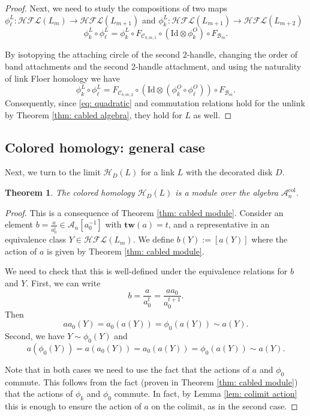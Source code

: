 \documentclass{amsart}
\newtheorem{theorem}{Theorem}[section]
\newcommand{\CA}{\mathcal{A}}
\newcommand{\CH}{\mathcal{H}}
\newcommand{\col}{\mathrm{col}}
\newcommand{\cHFL}{\mathcal{H\!F\! L}}
\newcommand{\HD}{\mathcal{H}}
\newcommand{\tw}{\mathbf{tw}}
\newcommand{\Id}{\mathrm{Id}}
\begin{document}
\begin{proof}
Next, we need to study the compositions of two maps $\phi_{\ell}^{L}: \cHFL(L_{m})\rightarrow\cHFL(L_{m+1})$ and $\phi_{k}^{L}: \cHFL(L_{ m+1})\rightarrow\cHFL(L_{ m+2})$
$$
\phi_{k}^{L}\circ \phi_{\ell}^{L}=
\phi_{k}^{L}\circ
F_{\mathcal{C}_{b,m,1}}\circ \left(\Id\otimes \phi_k^{O}\right)\circ F_{\mathcal{B}_{m}}.
$$



By isotopying the attaching circle of the second $2$-handle, changing the order of band attachments and the second 2-handle attachment, and using the naturality of link Floer homology we have
$$
\phi_{k}^{L}\circ \phi_{\ell}^{L}=F_{\mathcal{C}_{b,m,2}}\circ \left(\Id\otimes \left(\phi_{k}^{O}\circ\phi_{\ell}^{O}\right)\right)\circ F_{\mathcal{B}_{m}}.
$$
Consequently, since \eqref{eq: quadratic} and commutation relations hold for the unlink by Theorem \ref{thm: cabled algebra}, they hold for $L$ as well. 
\end{proof}


\subsection{Colored homology: general case}

Next, we turn to the limit $\HD_D(L)$ for a link $L$ with the decorated disk $D$.

\begin{theorem}
\label{thm: colored module}
The colored homology $\CH_{D}(L)$ is a module over the algebra $\CA_n^{\col}$.
\end{theorem}

\begin{proof}
This is a consequence of Theorem \ref{thm: cabled module}. Consider an element $b=\frac{a}{a_0^t}\in \CA_n[a_0^{-1}]$ with $\tw(a)=t$, and a representative in an equivalence class $Y\in \cHFL(L_{m})$. We define $b(Y):=[a(Y)]$  where the action of $a$ is given by Theorem \ref{thm: cabled module}.

We need to check that this is well-defined under the equivalence relations for $b$ and $Y$. First, we can write 
$$
b=\frac{a}{a_0^t}=\frac{aa_0}{a_0^{t+1}}.
$$
Then 
$$
aa_0(Y)=a_0(a(Y))=\phi_0(a(Y))\sim a(Y).
$$
Second, we have $Y\sim \phi_0(Y)$ and $$a(\phi_0(Y))=a(a_0(Y))=a_0(a(Y))=\phi_0(a(Y))\sim a(Y).$$

Note that in both cases we need to use the fact that the actions of $a$ and $\phi_0$ commute. This follows from the fact (proven in Theorem \ref{thm: cabled module}) that the actions of $\phi_k$ and $\phi_0$ commute. In fact, by Lemma \ref{lem: colimit action} this is enough to ensure the action of $a$ on the colimit, as in the second case.
\end{proof}
\end{document}

